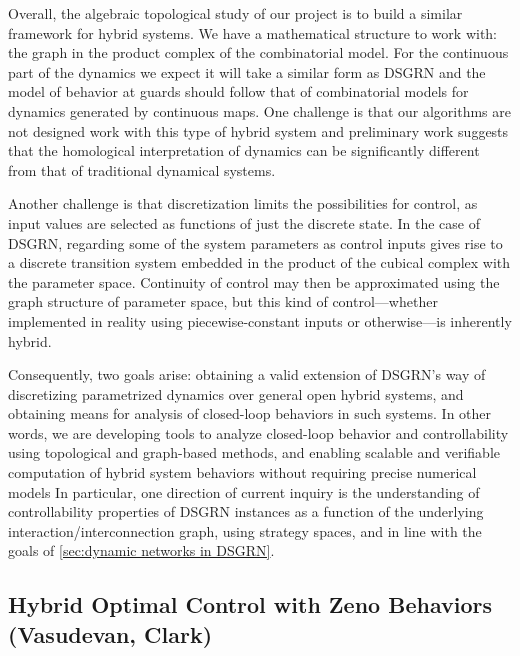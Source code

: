 \documentclass[letterpaper,11pt]{article}
\begin{document}
Overall, the algebraic topological study of our project is to build a similar framework for hybrid systems.
We have a mathematical structure to work with: the graph in the product complex of the combinatorial model.
For the continuous part of the dynamics we expect it will take a similar form as DSGRN and 
the model of behavior at guards should follow that of combinatorial models for dynamics generated by continuous maps.
One challenge is that our algorithms are not designed work with this type of hybrid system and preliminary work suggests that the homological interpretation of dynamics can be significantly different from that of traditional dynamical systems.

Another challenge is that discretization limits the possibilities for control, as input values are selected as functions of just the discrete state.
In the case of DSGRN, regarding some of the system parameters as control inputs gives rise to a discrete transition system embedded in the product of the cubical complex with the parameter space.
Continuity of control may then be approximated using the graph structure of parameter space, but this kind of control---whether implemented in reality using piecewise-constant inputs or otherwise---is inherently hybrid.


Consequently, two goals arise: obtaining a valid extension of DSGRN's way of discretizing parametrized dynamics over general open hybrid systems, and obtaining means for analysis of closed-loop behaviors in such systems.
In other words, we are developing tools to analyze closed-loop behavior and controllability using topological and graph-based methods, and enabling scalable and verifiable computation of hybrid system behaviors without requiring precise numerical models
In particular, one direction of current inquiry is the understanding of controllability properties of DSGRN instances as a function of the underlying interaction/interconnection graph, using strategy spaces, and in line with the goals of \ref{sec:dynamic networks in DSGRN}.

\subsection{Hybrid Optimal Control with Zeno Behaviors (Vasudevan, Clark)}\label{sec:Zeno}
\end{document}
